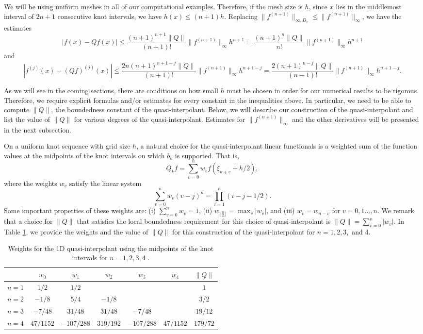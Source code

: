 \documentclass[10pt]{article}
\theoremstyle{definition}
\numberwithin{equation}{section}
\numberwithin{figure}{section}
\numberwithin{table}{section}
\begin{document}
We will be using uniform meshes in all of our computational examples. Therefore, if the mesh size is $h$, since $x$ lies in the middlemost interval of $2n+1$ consecutive knot intervals, we have $h(x)\leq(n+1)h$. Replacing $\|f^{(n+1)}\|_{\infty,D_x}\leq\|f^{(n+1)}\|_\infty$, we have the estimates
$$|f(x)-Qf(x)|\leq \frac{(n+1)^{n+1}\|Q\|}{(n+1)!}\|f^{(n+1)}\|_{\infty}h^{n+1}=\frac{(n+1)^n\|Q\|}{n!}\|f^{(n+1)}\|_{\infty}h^{n+1}$$
and 
$$|f^{(j)}(x)-(Qf)^{(j)}(x)|\leq \frac{2n(n+1)^{n+1-j}\|Q\|}{(n+1)!}\|f^{(n+1)}\|_{\infty}h^{n+1-j}=\frac{2(n+1)^{n-j}\|Q\|}{(n-1)!}\|f^{(n+1)}\|_{\infty}h^{n+1-j}.$$

As we will see in the coming sections, there are conditions on how small $h$ must be chosen in order for our numerical results to be rigorous. Therefore, we require explicit formulas and/or estimates for every constant in the inequalities above. In particular, we need to be able to compute $\|Q\|$, the boundedness constant of the quasi-interpolant. Below, we will describe our construction of the quasi-interpolant and list the value of $\|Q\|$ for various degrees of the quasi-interpolant. Estimates for $\|f^{(n+1)}\|_{\infty}$ and the other derivatives will be presented in the next subsection.%

On a uniform knot sequence with grid size $h$, a natural choice for the quasi-interpolant linear functionals is a weighted sum of the function values at the midpoints of the knot intervals on which $b_k$ is supported. That is,
$$Q_kf=\sum_{v=0}^nw_vf(\xi_{k+v}+h/2),$$
where the weights $w_v$ satisfy the linear system
$$\sum_{v=0}^nw_v(v-j)^n=\prod_{i=1}^n(i-j-1/2).$$
Some important properties of these weights are: (i) $\sum_{v=0}^nw_v=1$, (ii) $w_{\lfloor\frac{n}{2}\rfloor}=\max_v|w_v|$, and (iii) $w_v=w_{n-v}$ for $v=0,1\dots,n$. We remark that a choice for $\|Q\|$ that satisfies the local boundedness requirement for this choice of quasi-interpolant is $\|Q\|=\sum_{v=0}^n|w_v|$. In Table \ref{table:weights}, we provide the weights and the value of $\|Q\|$ for this construction of the quasi-interpolant for $n=1,2,3,$ and $4$.

\begin{table}[h]
\centering
\begin{tabular}{c|c|c|c|c|c|c}
& $w_0$ & $w_1$ & $w_2$ & $w_3$ & $w_4$ & $\|Q\|$ \\\hline
$n=1$ & $1/2$ & $1/2$ & & & & $1$ \\\hline
$n=2$ & $-1/8$ & $5/4$ & $-1/8$ & & & $3/2$ \\\hline
$n=3$ & $-7/48$ & $31/48$ & $31/48$ & $-7/48$ & & $19/12$   \\\hline
$n=4$ & $47/1152$ & $-107/288$ & $319/192$ & $-107/288$ & $47/1152$  & $179/72$ \\
\end{tabular}
\caption{Weights for the 1D quasi-interpolant using the midpoints of the knot intervals for $n=1,2,3,4$ \cite{hollig2013approximation}.}
\label{table:weights}
\end{table}
\end{document}
